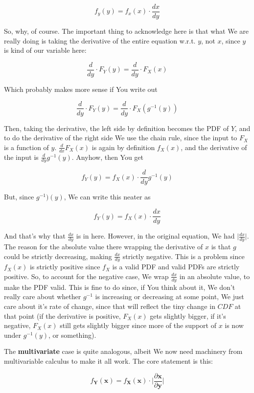 \documentclass{article}
\begin{document}
		\[ f_y(y) = f_x(x)\cdot \frac{dx}{dy} \]
			
		So, why, of course. The important thing to acknowledge here is that what We are really doing is taking the derivative of the entire equation w.r.t. $y$, not $x$, since $y$ is kind of our variable here:
		
		\[ \frac{d}{dy}\cdot F_Y(y)= \frac{d}{dy}\cdot F_X(x) \]
			
		Which probably makes more sense if You write out
		
		\[ \frac{d}{dy}\cdot F_Y(y)= \frac{d}{dy}\cdot F_X(g^{-1}(y)) \]
			
		Then, taking the derivative, the left side by definition becomes the PDF of $Y$, and to do the derivative of the right side We use the chain rule, since the input to $F_X$ is a function of $y$. $\frac{d}{dx} F_X(x)$ is again by definition $f_X(x)$, and the derivative of the input is $\frac{d}{dy}g^{-1}(y)$. Anyhow, then You get
		
		\[ f_Y(y) = f_X(x)\cdot\frac{d}{dy}g^{-1}(y) \]
		
		But, since $g^{-1})(y)$, We can write this neater as
		
		\[ f_Y(y) = f_X(x)\cdot\frac{dx}{dy} \]
		
		And that's why that $\frac{dx}{dy}$ is in here. However, in the original equation, We had $\big|\frac{dx}{dy}\big|$. The reason for the absolute value there wrapping the derivative of $x$ is that $g$ could be strictly decreasing, making $\frac{dx}{dy}$ strictly negative. This is a problem since $f_X(x)$ is strictly positive since $f_X$ is a valid PDF and valid PDFs are strictly positive. So, to account for the negative case, We wrap $\frac{dx}{dy}$ in an absolute value, to make the PDF valid. This is fine to do since, if You think about it, We don't really care about whether $g^{-1}$ is increasing or decreasing at some point, We just care about it's rate of change, since that will reflect the tiny change in $CDF$ at that point (if the derivative is positive, $F_X(x)$ gets slightly bigger, if it's negative, $F_X(x)$ still gets slightly bigger since more of the support of $x$ is now under $g^{-1}(y)$, or something).
		
		The \textbf{multivariate} case is quite analogous, albeit We now need machinery from multivariable calculus to make it all work. The core statement is this:
		
		\[ f_{\bm{Y}}(\bm{x}) = f_{\bm{X}}(\bm{x})\cdot \bigg|\frac{\partial\bm{x}}{\partial\bm{y}} \bigg| \]
		
\end{document}
